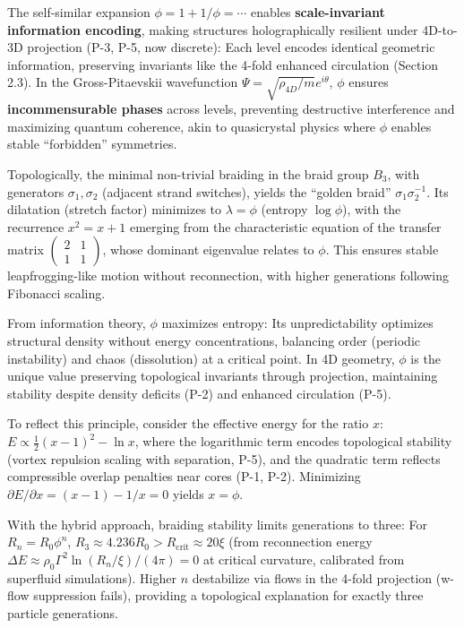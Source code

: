 The self-similar expansion $\phi = 1 + 1/\phi = \cdots$ enables \textbf{scale-invariant information encoding}, making structures holographically resilient under 4D-to-3D projection (P-3, P-5, now discrete): Each level encodes identical geometric information, preserving invariants like the 4-fold enhanced circulation (Section 2.3). In the Gross-Pitaevskii wavefunction $\Psi = \sqrt{\rho_{4D}/m} e^{i \theta}$, $\phi$ ensures \textbf{incommensurable phases} across levels, preventing destructive interference and maximizing quantum coherence, akin to quasicrystal physics where $\phi$ enables stable ``forbidden'' symmetries.

Topologically, the minimal non-trivial braiding in the braid group $B_3$, with generators $\sigma_1, \sigma_2$ (adjacent strand switches), yields the ``golden braid'' $\sigma_1 \sigma_2^{-1}$. Its dilatation (stretch factor) minimizes to $\lambda = \phi$ (entropy $\log \phi$), with the recurrence $x^2 = x + 1$ emerging from the characteristic equation of the transfer matrix $\begin{pmatrix} 2 & 1 \\ 1 & 1 \end{pmatrix}$, whose dominant eigenvalue relates to $\phi$. This ensures stable leapfrogging-like motion without reconnection, with higher generations following Fibonacci scaling.

From information theory, $\phi$ maximizes entropy: Its unpredictability optimizes structural density without energy concentrations, balancing order (periodic instability) and chaos (dissolution) at a critical point. In 4D geometry, $\phi$ is the unique value preserving topological invariants through projection, maintaining stability despite density deficits (P-2) and enhanced circulation (P-5).

To reflect this principle, consider the effective energy for the ratio $x$: $E \propto \frac{1}{2} (x - 1)^2 - \ln x$, where the logarithmic term encodes topological stability (vortex repulsion scaling with separation, P-5), and the quadratic term reflects compressible overlap penalties near cores (P-1, P-2). Minimizing $\partial E / \partial x = (x - 1) - 1/x = 0$ yields $x = \phi$.

With the hybrid approach, braiding stability limits generations to three: For $R_n = R_0 \phi^n$, $R_3 \approx 4.236 R_0 > R_{\text{crit}} \approx 20 \xi$ (from reconnection energy $\Delta E \approx \rho_0 \Gamma^2 \ln(R_n / \xi) / (4\pi) = 0$ at critical curvature, calibrated from superfluid simulations). Higher $n$ destabilize via flows in the 4-fold projection (w-flow suppression fails), providing a topological explanation for exactly three particle generations.

